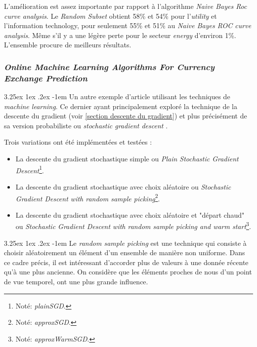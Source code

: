\documentclass[a4paper, 11pt]{article}
\makeatletter
\newcounter{subsubsubsection}[subsubsection]
\renewcommand\paragraph{\@startsection{paragraph}{5}{\z@}%
  {3.25ex \@plus1ex \@minus.2ex}%
  {-1em}%
  {\normalfont\normalsize\bfseries}}
\makeatother
\begin{document}
L'amélioration est assez importante par rapport à l'algorithme \textit{Naive Bayes Roc curve analysis}. 
Le \textit{Random Subset} obtient 58\% et 54\% pour l'\textit{utility} et l'{information technology}, pour seulement 
55\% et 51\% au \textit{Naive Bayes ROC curve analysis}. Même s'il y a une légère perte pour le secteur 
\textit{energy} d'environ 1\%.
L'ensemble procure de meilleurs résultats.

\subsubsection{\textit{Online Machine Learning Algorithms For Currency Exchange Prediction}}

\paragraph{}
Un autre exemple d'article utilisant les techniques de \textit{machine learning}. Ce dernier ayant principalement exploré la technique de la descente du gradient 
(voir \ref{section descente du gradient}) et plus précisément de sa version probabiliste ou
\textit{stochastic gradient descent} \cite{descente_du_gradient_stochastique}.

Trois variations ont été implémentées et testées :
\begin{itemize}
\item La descente du gradient stochastique simple ou \textit{Plain Stochastic Gradient Descent}\footnote{Noté: \textit{plainSGD}.}.
\item La descente du gradient stochastique avec choix aléatoire ou \textit{Stochastic Gradient Descent with random sample picking}\footnote{Noté: \textit{approxSGD}.}.
\item La descente du gradient stochastique avec choix aléatoire et "départ chaud" ou \textit{Stochastic Gradient Descent with random sample picking and warm start}\footnote{Noté: \textit{approxWarmSGD}.}.
\end{itemize}

\paragraph{}
Le \textit{random sample picking} est une technique qui consiste à choisir aléatoirement un élément d'un ensemble
de manière non uniforme. Dans ce cadre précis, il est intéressant d'accorder plus de valeurs à une donnée
récente qu'à une plus ancienne. On considère que les éléments proches de nous d'un point de vue temporel,
ont une plus grande influence.
\end{document}
